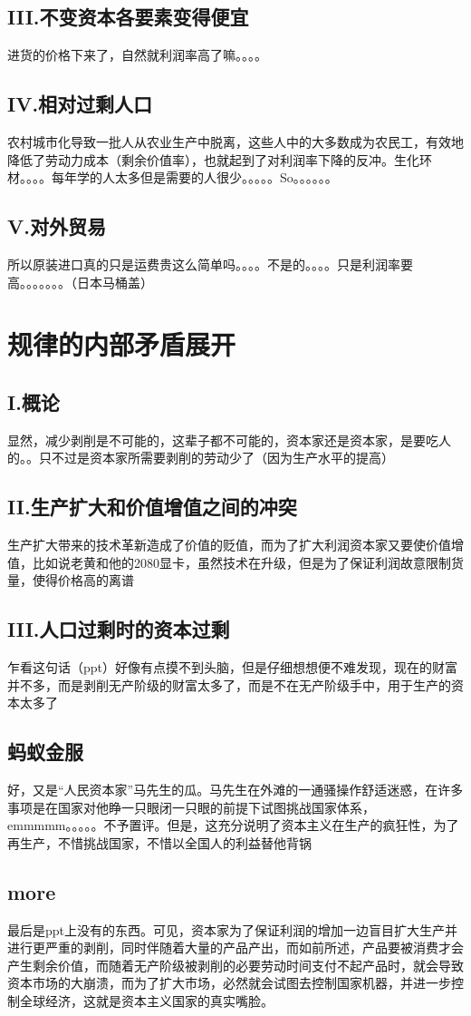\documentclass[utf8]{ctexart}
\begin{document}
	\subsection{III.不变资本各要素变得便宜}
	进货的价格下来了，自然就利润率高了嘛。。。。
	\subsection{IV.相对过剩人口}
	农村城市化导致一批人从农业生产中脱离，这些人中的大多数成为农民工，有效地降低了劳动力成本（剩余价值率），也就起到了对利润率下降的反冲。生化环材。。。。每年学的人太多但是需要的人很少。。。。。So。。。。。。
	\subsection{V.对外贸易}
	所以原装进口真的只是运费贵这么简单吗。。。。不是的。。。。只是利润率要高。。。。。。。（日本马桶盖）
	\section{规律的内部矛盾展开}
	\subsection{I.概论}
	显然，减少剥削是不可能的，这辈子都不可能的，资本家还是资本家，是要吃人的。。只不过是资本家所需要剥削的劳动少了（因为生产水平的提高）
	\subsection{II.生产扩大和价值增值之间的冲突}
	生产扩大带来的技术革新造成了价值的贬值，而为了扩大利润资本家又要使价值增值，比如说老黄和他的2080显卡，虽然技术在升级，但是为了保证利润故意限制货量，使得价格高的离谱
	\subsection{III.人口过剩时的资本过剩}
	乍看这句话（ppt）好像有点摸不到头脑，但是仔细想想便不难发现，现在的财富并不多，而是剥削无产阶级的财富太多了，而是不在无产阶级手中，用于生产的资本太多了
	\subsection{蚂蚁金服}
	好，又是“人民资本家”马先生的瓜。马先生在外滩的一通骚操作舒适迷惑，在许多事项是在国家对他睁一只眼闭一只眼的前提下试图挑战国家体系，emmmmm。。。。。不予置评。但是，这充分说明了资本主义在生产的疯狂性，为了再生产，不惜挑战国家，不惜以全国人的利益替他背锅
	\subsection{more}
	最后是ppt上没有的东西。可见，资本家为了保证利润的增加一边盲目扩大生产并进行更严重的剥削，同时伴随着大量的产品产出，而如前所述，产品要被消费才会产生剩余价值，而随着无产阶级被剥削的必要劳动时间支付不起产品时，就会导致资本市场的大崩溃，而为了扩大市场，必然就会试图去控制国家机器，并进一步控制全球经济，这就是资本主义国家的真实嘴脸。
\end{document}
